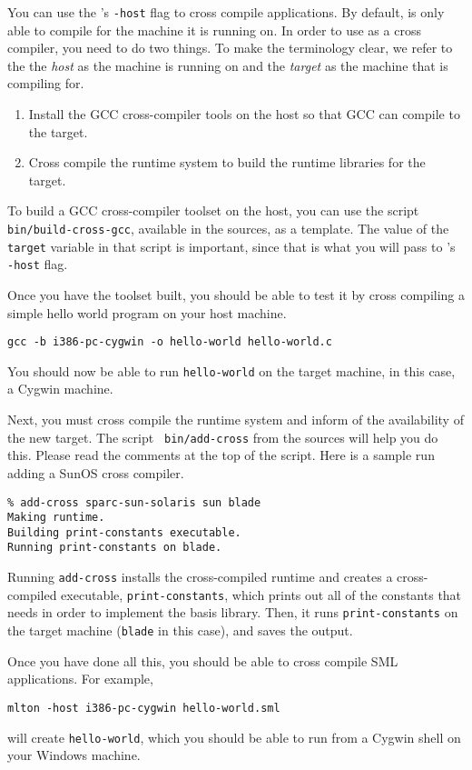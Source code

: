 
You can use the {\mlton}'s {\tt -host} flag to cross compile
applications.  By default, {\mlton} is only able to compile for the
machine it is running on.  In order to use {\mlton} as a cross
compiler, you need to do two things.  To make the terminology clear,
we refer to the the {\em host} as the machine {\mlton} is running on
and the {\em target} as the machine that {\mlton} is compiling for.

\begin{enumerate}

\item Install the GCC cross-compiler tools on the host so that GCC can
compile to the target.

\item Cross compile the {\mlton} runtime system to build the runtime
libraries for the target.

\end{enumerate}

To build a GCC cross-compiler toolset on the host, you can use the
script {\tt bin/build-cross-gcc}, available in the {\mlton} sources,
as a template.  The value of the {\tt target} variable in that script
is important, since that is what you will pass to {\mlton}'s {\tt
-host} flag.

Once you have the toolset built, you should be able to test it by
cross compiling a simple hello world program on your host machine.
\begin{verbatim}
gcc -b i386-pc-cygwin -o hello-world hello-world.c
\end{verbatim}
You should now be able to run {\tt hello-world} on the target machine,
in this case, a Cygwin machine.

Next, you must cross compile the {\mlton} runtime system and inform
{\mlton} of the availability of the new target.  The script {\tt
bin/add-cross} from the {\mlton} sources will help you do this.
Please read the comments at the top of the script.  Here is a sample
run adding a SunOS cross compiler.
\begin{verbatim}
% add-cross sparc-sun-solaris sun blade
Making runtime.
Building print-constants executable.
Running print-constants on blade.
\end{verbatim}
Running {\tt add-cross} installs the cross-compiled runtime and
creates a cross-compiled executable, {\tt print-constants}, which
prints out all of the constants that {\mlton} needs in order to
implement the basis library.  Then, it runs {\tt print-constants} on
the target machine ({\tt blade} in this case), and saves the output.

Once you have done all this, you should be able to cross compile SML
applications.  For example,
\begin{verbatim}
mlton -host i386-pc-cygwin hello-world.sml
\end{verbatim}
will create {\tt hello-world}, which you should be able to run from a
Cygwin shell on your Windows machine.
